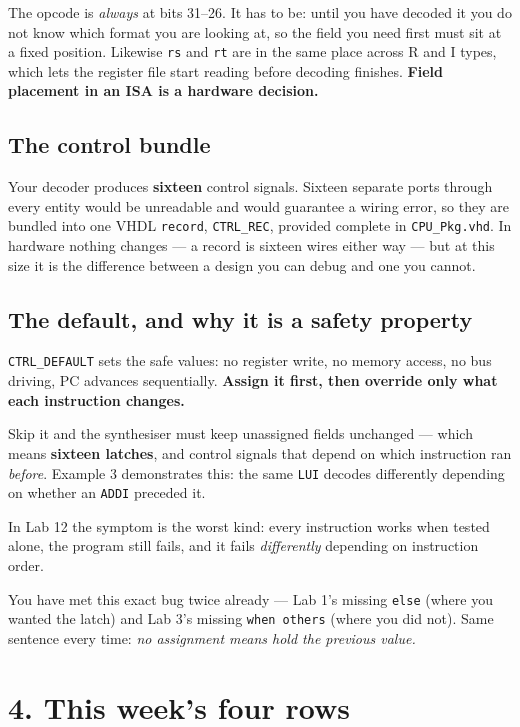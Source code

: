 \documentclass[11pt]{article}
\newcommand{\code}[1]{\texttt{#1}}
\begin{document}
The opcode is \emph{always} at bits 31--26. It has to be: until you have decoded
it you do not know which format you are looking at, so the field you need first
must sit at a fixed position. Likewise \code{rs} and \code{rt} are in the same
place across R and I types, which lets the register file start reading before
decoding finishes. \textbf{Field placement in an ISA is a hardware decision.}

\subsection*{The control bundle}

Your decoder produces \textbf{sixteen} control signals. Sixteen separate ports
through every entity would be unreadable and would guarantee a wiring error, so
they are bundled into one VHDL \code{record}, \code{CTRL\_REC}, provided
complete in \code{CPU\_Pkg.vhd}. In hardware nothing changes --- a record is
sixteen wires either way --- but at this size it is the difference between a
design you can debug and one you cannot.

\subsection*{The default, and why it is a safety property}

\code{CTRL\_DEFAULT} sets the safe values: no register write, no memory access,
no bus driving, PC advances sequentially. \textbf{Assign it first, then
override only what each instruction changes.}

Skip it and the synthesiser must keep unassigned fields unchanged --- which
means \textbf{sixteen latches}, and control signals that depend on which
instruction ran \emph{before}. Example 3 demonstrates this: the same \code{LUI}
decodes differently depending on whether an \code{ADDI} preceded it.

In Lab 12 the symptom is the worst kind: every instruction works when tested
alone, the program still fails, and it fails \emph{differently} depending on
instruction order.

You have met this exact bug twice already --- Lab 1's missing \code{else} (where
you wanted the latch) and Lab 3's missing \code{when others} (where you did
not). Same sentence every time: \emph{no assignment means hold the previous
value.}

\section*{4. This week's four rows}
\end{document}
